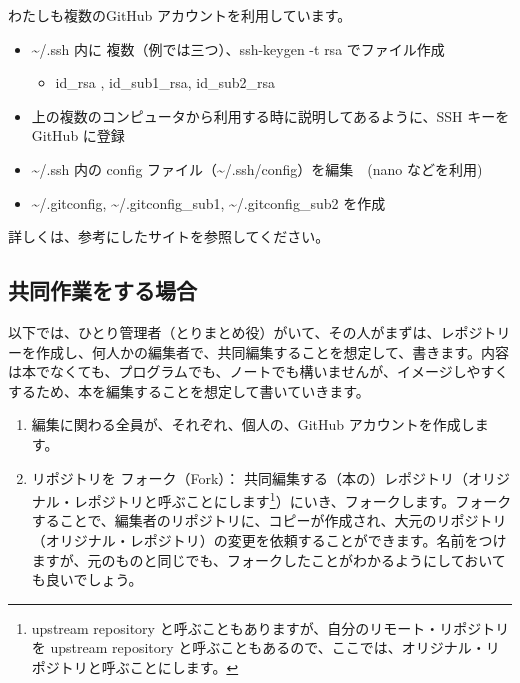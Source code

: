 \documentclass[
  xelatex, ja=standard]{bxjsbook}
\providecommand{\tightlist}{%
  \setlength{\itemsep}{0pt}\setlength{\parskip}{0pt}}
\theoremstyle{definition}
\theoremstyle{definition}
\theoremstyle{definition}
\theoremstyle{definition}
\theoremstyle{remark}
\begin{document}
わたしも複数のGitHub アカウントを利用しています。

\begin{itemize}
\tightlist
\item
  \textasciitilde/.ssh 内に 複数（例では三つ）、ssh-keygen -t rsa でファイル作成

  \begin{itemize}
  \tightlist
  \item
    id\_rsa , id\_sub1\_rsa, id\_sub2\_rsa
  \end{itemize}
\item
  上の複数のコンピュータから利用する時に説明してあるように、SSH キーを GitHub に登録
\item
  \textasciitilde/.ssh 内の config ファイル（\textasciitilde/.ssh/config）を編集　(nano などを利用)
\item
  \textasciitilde/.gitconfig, \textasciitilde/.gitconfig\_sub1, \textasciitilde/.gitconfig\_sub2 を作成
\end{itemize}

詳しくは、参考にしたサイトを参照してください。

\hypertarget{ux5171ux540cux4f5cux696dux3092ux3059ux308bux5834ux5408}{%
\subsection{共同作業をする場合}\label{ux5171ux540cux4f5cux696dux3092ux3059ux308bux5834ux5408}}

以下では、ひとり管理者（とりまとめ役）がいて、その人がまずは、レポジトリーを作成し、何人かの編集者で、共同編集することを想定して、書きます。内容は本でなくても、プログラムでも、ノートでも構いませんが、イメージしやすくするため、本を編集することを想定して書いていきます。

\begin{enumerate}
\def\labelenumi{\arabic{enumi}.}
\item
  編集に関わる全員が、それぞれ、個人の、GitHub アカウントを作成します。
\item
  リポジトリを フォーク（Fork）： 共同編集する（本の）レポジトリ（オリジナル・レポジトリと呼ぶことにします\footnote{upstream repository と呼ぶこともありますが、自分のリモート・リポジトリを upstream repository と呼ぶこともあるので、ここでは、オリジナル・リポジトリと呼ぶことにします。}）にいき、フォークします。フォークすることで、編集者のリポジトリに、コピーが作成され、大元のリポジトリ（オリジナル・レポジトリ）の変更を依頼することができます。名前をつけますが、元のものと同じでも、フォークしたことがわかるようにしておいても良いでしょう。
\end{enumerate}
\end{document}
